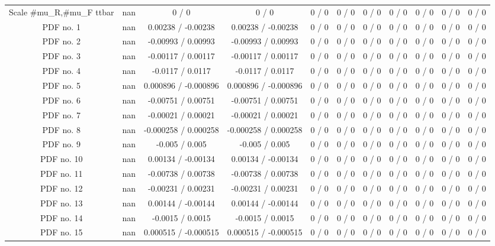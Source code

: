 \begin{table}[htbp]
\begin{center}
\begin{tabular}{|c|c|c|c|c|c|c|c|c|c|c|}
  Scale #mu_{R},#mu_{F} ttbar &    nan    & 0 / 0 & 0 / 0 & 0 / 0 & 0 / 0 & 0 / 0 & 0 / 0 & 0 / 0 & 0 / 0 & 0 / 0 \\ 
  PDF no. 1 &    nan    & 0.00238 / -0.00238 & 0.00238 / -0.00238 & 0 / 0 & 0 / 0 & 0 / 0 & 0 / 0 & 0 / 0 & 0 / 0 & 0 / 0 \\ 
  PDF no. 2 &    nan    & -0.00993 / 0.00993 & -0.00993 / 0.00993 & 0 / 0 & 0 / 0 & 0 / 0 & 0 / 0 & 0 / 0 & 0 / 0 & 0 / 0 \\ 
  PDF no. 3 &    nan    & -0.00117 / 0.00117 & -0.00117 / 0.00117 & 0 / 0 & 0 / 0 & 0 / 0 & 0 / 0 & 0 / 0 & 0 / 0 & 0 / 0 \\ 
  PDF no. 4 &    nan    & -0.0117 / 0.0117 & -0.0117 / 0.0117 & 0 / 0 & 0 / 0 & 0 / 0 & 0 / 0 & 0 / 0 & 0 / 0 & 0 / 0 \\ 
  PDF no. 5 &    nan    & 0.000896 / -0.000896 & 0.000896 / -0.000896 & 0 / 0 & 0 / 0 & 0 / 0 & 0 / 0 & 0 / 0 & 0 / 0 & 0 / 0 \\ 
  PDF no. 6 &    nan    & -0.00751 / 0.00751 & -0.00751 / 0.00751 & 0 / 0 & 0 / 0 & 0 / 0 & 0 / 0 & 0 / 0 & 0 / 0 & 0 / 0 \\ 
  PDF no. 7 &    nan    & -0.00021 / 0.00021 & -0.00021 / 0.00021 & 0 / 0 & 0 / 0 & 0 / 0 & 0 / 0 & 0 / 0 & 0 / 0 & 0 / 0 \\ 
  PDF no. 8 &    nan    & -0.000258 / 0.000258 & -0.000258 / 0.000258 & 0 / 0 & 0 / 0 & 0 / 0 & 0 / 0 & 0 / 0 & 0 / 0 & 0 / 0 \\ 
  PDF no. 9 &    nan    & -0.005 / 0.005 & -0.005 / 0.005 & 0 / 0 & 0 / 0 & 0 / 0 & 0 / 0 & 0 / 0 & 0 / 0 & 0 / 0 \\ 
  PDF no. 10 &    nan    & 0.00134 / -0.00134 & 0.00134 / -0.00134 & 0 / 0 & 0 / 0 & 0 / 0 & 0 / 0 & 0 / 0 & 0 / 0 & 0 / 0 \\ 
  PDF no. 11 &    nan    & -0.00738 / 0.00738 & -0.00738 / 0.00738 & 0 / 0 & 0 / 0 & 0 / 0 & 0 / 0 & 0 / 0 & 0 / 0 & 0 / 0 \\ 
  PDF no. 12 &    nan    & -0.00231 / 0.00231 & -0.00231 / 0.00231 & 0 / 0 & 0 / 0 & 0 / 0 & 0 / 0 & 0 / 0 & 0 / 0 & 0 / 0 \\ 
  PDF no. 13 &    nan    & 0.00144 / -0.00144 & 0.00144 / -0.00144 & 0 / 0 & 0 / 0 & 0 / 0 & 0 / 0 & 0 / 0 & 0 / 0 & 0 / 0 \\ 
  PDF no. 14 &    nan    & -0.0015 / 0.0015 & -0.0015 / 0.0015 & 0 / 0 & 0 / 0 & 0 / 0 & 0 / 0 & 0 / 0 & 0 / 0 & 0 / 0 \\ 
  PDF no. 15 &    nan    & 0.000515 / -0.000515 & 0.000515 / -0.000515 & 0 / 0 & 0 / 0 & 0 / 0 & 0 / 0 & 0 / 0 & 0 / 0 & 0 / 0 \\ 

\end{tabular}
\end{center}
\end{table}
